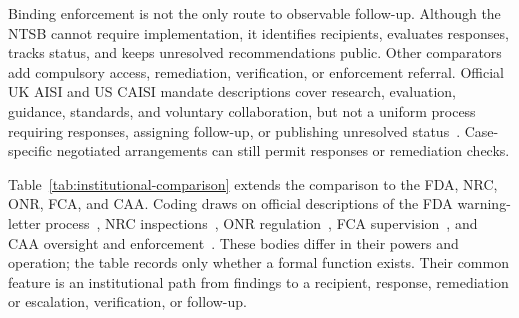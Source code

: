 \documentclass{article}
\begin{document}
Binding enforcement is not the only route to observable follow-up. Although the NTSB cannot require implementation, it identifies recipients, evaluates responses, tracks status, and keeps unresolved recommendations public. Other comparators add compulsory access, remediation, verification, or enforcement referral. Official UK AISI and US CAISI mandate descriptions cover research, evaluation, guidance, standards, and voluntary collaboration, but not a uniform process requiring responses, assigning follow-up, or publishing unresolved status~\citep{ukaisi2025,uscaisi2026}. Case-specific negotiated arrangements can still permit responses or remediation checks.

Table~\ref{tab:institutional-comparison} extends the comparison to the FDA, NRC, ONR, FCA, and CAA. Coding draws on official descriptions of the FDA warning-letter process~\citep{fda_warning}, NRC inspections~\citep{nrc_inspection}, ONR regulation~\citep{onr_regulation}, FCA supervision~\citep{fca_supervision}, and CAA oversight and enforcement~\citep{caa_oversight,caa_enforcement}. These bodies differ in their powers and operation; the table records only whether a formal function exists. Their common feature is an institutional path from findings to a recipient, response, remediation or escalation, verification, or follow-up.
\end{document}
